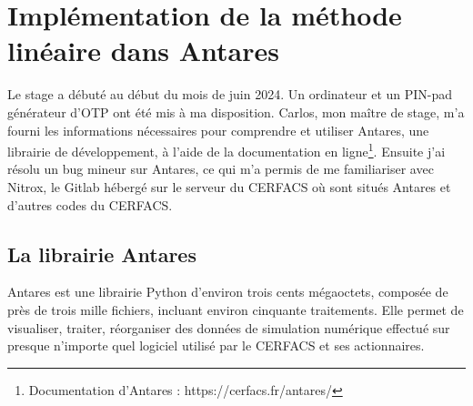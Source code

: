 \chapter{Implémentation de la méthode linéaire dans Antares}





Le stage a débuté au début du mois de juin 2024. Un ordinateur et un PIN-pad générateur d'\ac{OTP} ont été mis à ma disposition. Carlos, mon maître de stage, m'a fourni les informations nécessaires pour comprendre et utiliser Antares\cite{antares}, une librairie de développement, à l'aide de la documentation en ligne\footnote{Documentation d'Antares : https://cerfacs.fr/antares/}. Ensuite j'ai résolu un bug mineur sur Antares, ce qui m'a permis de me familiariser avec Nitrox, le Gitlab hébergé sur le serveur du CERFACS où sont situés Antares et d'autres codes du CERFACS.


\section{La librairie Antares}

Antares est une librairie Python d'environ trois cents mégaoctets, composée de près de trois mille fichiers, incluant environ cinquante traitements.
Elle permet de visualiser, traiter, réorganiser des données de simulation numérique effectué sur presque n'importe quel logiciel utilisé par le CERFACS et ses actionnaires.

